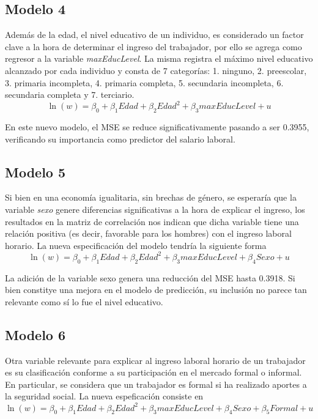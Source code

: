 \documentclass[11pt, a4paper]{article}
\begin{document}
 \subsection{Modelo 4}

Además de la edad, el nivel educativo de un individuo, es considerado un factor clave a la hora de determinar el ingreso del trabajador, por ello se agrega como regresor a la variable \textit{maxEducLevel}. La misma registra el máximo nivel educativo alcanzado por cada individuo y consta de 7 categorías: 1. ninguno, 2. preescolar, 3. primaria incompleta, 4. primaria completa, 5. secundaria incompleta, 6. secundaria completa y 7. terciario. 
\begin{equation*}
\ln(w) = \beta_0 + \beta_1 \textit{Edad}  +\beta_2 \textit{Edad} ^2 + \beta_3 \textit{maxEducLevel}  + u
\end{equation*}

En este nuevo modelo, el MSE se reduce significativamente pasando a ser 0.3955, verificando su importancia como predictor del salario laboral. 

\subsection{Modelo 5}

Si bien en una economía igualitaria, sin brechas de género, se esperaría que la variable \textit{sexo} genere diferencias significativas a la hora de explicar el ingreso, los resultados en la matriz de correlación nos indican que dicha variable tiene una relación positiva (es decir, favorable para los hombres) con el ingreso laboral horario.  La nueva especificación del modelo tendría la siguiente forma
\begin{equation*}
\ln(w) = \beta_0 + \beta_1 \textit{Edad}  + \beta_2 \textit{Edad} ^2 + \beta_3 \textit{maxEducLevel} +\beta_4 \textit{Sexo} +  u
\end{equation*}

La adición de la variable sexo genera una reducción del MSE hasta 0.3918. Si bien constitye una mejora en el modelo de predicción, su inclusión no parece tan relevante como sí lo fue el nivel educativo. 

\subsection{Modelo 6}

Otra variable relevante para explicar al ingreso laboral horario de un trabajador es su clasificación conforme a su participación en el mercado formal o informal. En particular, se considera que un trabajador es formal si  ha realizado aportes a la seguridad social. La nueva espeficación consiste en  
\begin{equation*}
\ln(w) = \beta_0 + \beta_1 \textit{Edad}  + \beta_2 \textit{Edad} ^2 + \beta_3 \textit{maxEducLevel} +\beta_4 \textit{Sexo} +\beta_5 \textit{Formal}  + u
\end{equation*}
\end{document}
